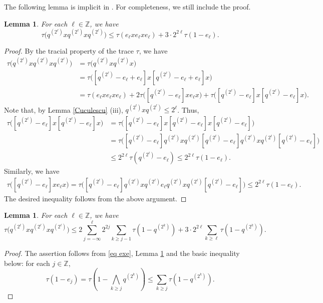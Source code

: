 \documentclass[11]{amsart}
\numberwithin{equation}{section}
\newtheorem{lemma}[theorem]{Lemma}
\begin{document}
The following lemma is implicit in \cite{JOW2018}. For completeness, we still include the proof.

\begin{lemma}\label{lem tau qN}
	For each $\ell\in\mathbb{Z}$, we have 
	$$\tau\Big(q^{(2^{\ell})}xq^{(2^{\ell})}xq^{(2^{\ell})}\Big)\leq \tau(e_{\ell}xe_{\ell}xe_{\ell})+3\cdot 2^{2\ell}\tau(1-e_{\ell}).$$
\end{lemma}
\begin{proof}
By the tracial property of the trace $\tau$, we have
\begin{align*}
	\tau\Big(q^{(2^{\ell})}xq^{(2^{\ell})}xq^{(2^{\ell})}\Big)&=	\tau\Big(q^{(2^{\ell})}xq^{(2^{\ell})}x\Big)\\
	&=\tau\Big([q^{(2^{\ell})}-e_{\ell}+e_{\ell}]x[q^{(2^{\ell})}-e_{\ell}+e_{\ell}]x\Big)\\
	&=\tau(e_{\ell}xe_{\ell}xe_{\ell})+ 2\tau\Big([q^{(2^{\ell})}-e_{\ell}]xe_{\ell}x\Big)+\tau\Big([q^{(2^{\ell})}-e_{\ell}]x[q^{(2^{\ell})}-e_{\ell}]x\Big).
\end{align*}
Note that, by Lemma \ref{Cuculescu} (iii), $q^{(2^{\ell})}xq^{(2^{\ell})}\leq 2^{\ell}$. Thus,
\begin{align*}
	\tau\Big([q^{(2^{\ell})}-e_{\ell}]x[q^{(2^{\ell})}-e_{\ell}]x\Big)&=\tau\Big([q^{(2^{\ell})}-e_{\ell}]x[q^{(2^{\ell})}-e_{\ell}]x[q^{(2^{\ell})}-e_{\ell}]\Big)\\
	&=\tau\Big([q^{(2^{\ell})}-e_{\ell}]q^{(2^{\ell})}xq^{(2^{\ell})}[q^{(2^{\ell})}-e_{\ell}]q^{(2^{\ell})}xq^{(2^{\ell})}[q^{(2^{\ell})}-e_{\ell}]\Big)\\
	&\leq 2^{2\ell} \tau(q^{(2^{\ell})}-e_{\ell})\leq  2^{2\ell} \tau(1-e_{\ell}).
\end{align*}
Similarly, we have
\begin{align*}
	\tau\Big([q^{(2^{\ell})}-e_{\ell}]xe_{\ell}x\Big)=\tau\Big([q^{(2^{\ell})}-e_{\ell}]q^{(2^{\ell})}xq^{(2^{\ell})}e_{\ell}q^{(2^{\ell})}xq^{(2^{\ell})}[q^{(2^{\ell})}-e_{\ell}]\Big)\leq 2^{2\ell} \tau(1-e_{\ell}).
\end{align*}
The desired inequality follows from the above argument. 
\end{proof}

\begin{lemma}\label{lem tau qxq}
		For each $\ell\in\mathbb{Z}$, we have
		$$\tau\Big(q^{(2^{\ell})}xq^{(2^{\ell})}xq^{(2^{\ell})}\Big)\leq 2\sum_{j=-\infty}^{\ell}2^{2j}\sum_{k\geq j-1}\tau(1-q^{(2^k)})+3\cdot 2^{2\ell}\sum_{k\geq \ell}\tau(1-q^{(2^k)}).$$
\end{lemma}
\begin{proof}
The assertion follows from \eqref{eq exe}, Lemma \ref{lem tau qN} and the basic inequality below: for each $j\in\mathbb{Z}$,
	$$	\tau(1-e_{j})=\tau(1-\bigwedge_{k\geq j}q^{(2^k)})\leq \sum_{k\geq j} \tau(1-q^{(2^k)}).$$
\end{proof}
\end{document}
